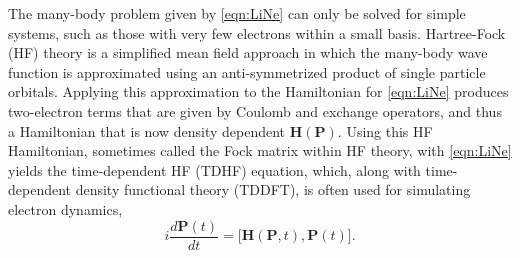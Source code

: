 \documentclass[10pt]{article}
\begin{document}
The many-body problem given by  \eqref{eqn:LiNe} can only be solved for simple systems, such as those with very few electrons within a small basis. 
Hartree-Fock (HF) theory is a simplified mean field approach in which the many-body wave function is approximated using an anti-symmetrized product of single particle orbitals. Applying this approximation to the Hamiltonian for   \eqref{eqn:LiNe} produces two-electron terms that are given by Coulomb and exchange operators, and thus a Hamiltonian that is now density dependent $\mathbf{H}(\mathbf{P})$.  Using this HF Hamiltonian, sometimes called the Fock matrix within HF theory, with \eqref{eqn:LiNe} yields the time-dependent HF (TDHF) equation, which, along with time-dependent density functional theory (TDDFT), is often used for simulating electron dynamics, 
\begin{equation}
\label{eqn:eq1}
i\frac{d \mathbf{P}(t)}{d t} =  \big [   \mathbf{H}(\mathbf{P},t), \mathbf{P}(t) \big].
\end{equation}
\end{document}
